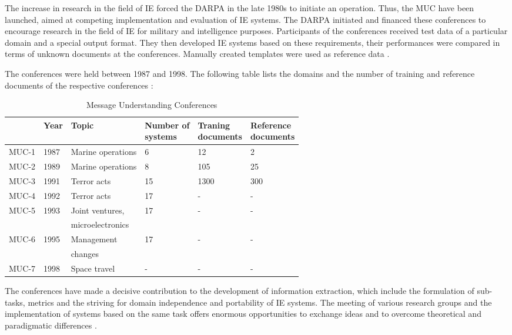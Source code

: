 The increase in research in the field of IE forced the \gls{DARPA} in the late 1980s to initiate an operation. Thus, the \gls{MUC} have been launched, aimed at competing implementation and evaluation of IE systems. The \gls{DARPA} initiated and financed these conferences to encourage research in the field of \gls{IE} for military and intelligence purposes. Participants of the conferences received test data of a particular domain and a special output format. They then developed IE systems based on these requirements, their performances were compared in terms of unknown documents at the conferences. Manually created templates were used as reference data \cite{Grishman:1996}\cite{Grishman:1997}.

The conferences were held between 1987 and 1998. The following table lists the domains and the number of training and reference documents of the respective conferences \cite{Turmo:2006}\cite{Appelt:1999}\cite{Cunningham:2005}\cite{Linsmayr:2010}:

\begin{table}[H]
\centering
\begin{tabular*}{\textwidth}{ l l l l l l }
	\toprule
	& Year & Topic & \shortstack{Number of \\ systems} & \shortstack{Traning \\ documents} & \shortstack{Reference \\ documents} \\
	\midrule
	MUC-1 & 1987 & Marine operations & 6 & 12 & 2 \\
	MUC-2 & 1989 & Marine operations & 8 & 105 & 25 \\
	MUC-3 & 1991 & Terror acts & 15 & 1300 & 300 \\
	MUC-4 & 1992 & Terror acts & 17 & - & - \\
	MUC-5 & 1993 & Joint ventures, & 17 & - & - \\
	& & microelectronics & & & \\
	MUC-6 & 1995 & Management & 17 & - & - \\
	& & changes & & & \\
	MUC-7 & 1998 & Space travel & - & - & - \\
	\bottomrule
\end{tabular*}
\caption{Message Understanding Conferences}
\end{table}

The conferences have made a decisive contribution to the development of information extraction, which include the formulation of sub-tasks, metrics and the striving for domain independence and portability of \gls{IE} systems. The meeting of various research groups and the implementation of systems based on the same task offers enormous opportunities to exchange ideas and to overcome theoretical and paradigmatic differences \cite{Cimiano:2003}\cite{Lehnert:1994}.

